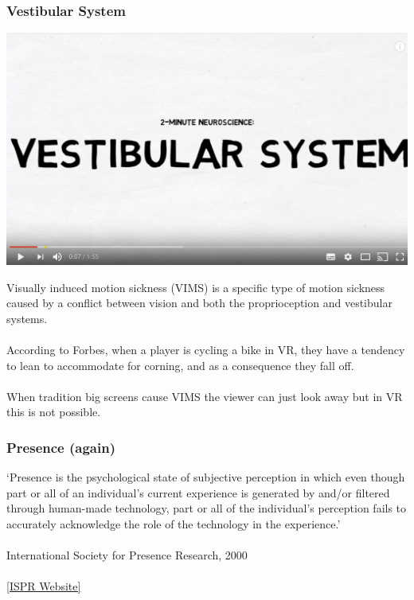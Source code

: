 \begin{frame}
	\frametitle{Vestibular System}
	\begin{center}
		\href{https://www.youtube.com/watch?v=P3aYqxGesqs}{\includegraphics[scale=.3]{assets/vestibular} }
	\end{center}
\end{frame}

\begin{frame}
	Visually induced motion sickness (VIMS) is a specific type of motion sickness caused by a conflict between vision and both the proprioception and vestibular systems.  \\~\\
	
	According to Forbes, when a player is cycling a bike in VR, they have a tendency to lean to accommodate for corning, and as a consequence they fall off. \\~\\
	
	When tradition big screens cause VIMS the viewer can just look away but in VR this is not possible. 

\end{frame}




\begin{frame}
	\frametitle{Presence (again)}
	
	`Presence is the psychological state of subjective perception in which even though part or all of an individual's current experience is generated by and/or filtered through human-made technology, part or all of the individual's perception fails to accurately acknowledge the role of the technology in the experience.' \\~\\
	
	International Society for Presence Research, 2000
	\\~\\
	\href{http://ispr.info}{[ISPR Website]}	
	
\end{frame}


